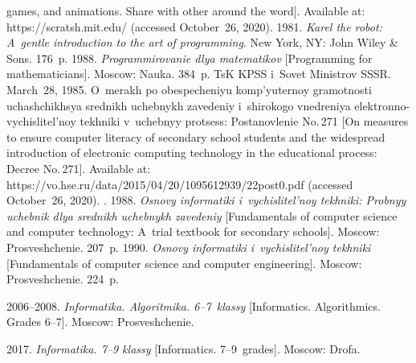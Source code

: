 \begin{multicols}{2}
{{\begin{thebibliography}{99}
games, and animations. Share with other around the word]. Available at: {\sf https://scratsh.mit.edu/} 
(accessed October~26, 2020).
 1981. \textit{Karel the robot: A~gentle introduction to the art of programming}. 
New York, NY: John Wiley \& Sons. 176~p. 
 1988. \textit{Programmirovanie dlya 
matematikov} [Programming for mathematicians]. Moscow: Nauka. 384~p.
TsK KPSS i~Sovet Ministrov SSSR. March~28, 1985. O~merakh po obespecheniyu komp'yuternoy 
gramotnosti uchashchikhsya srednikh uchebnykh zavedeniy i~shirokogo vnedreniya 
elektronno-vychislitel'noy tekh\-ni\-ki v~uchebnyy protsess: Postanovlenie No.\,271 [On measures to 
ensure computer 
literacy of secondary school students and the widespread introduction of electronic computing technology 
in the educational process: Decree No.\,271]. Available at:  {\sf 
https://vo.hse.ru/\linebreak data/2015/04/20/1095612939/22post0.pdf} (accessed October~26, 2020).
. 
1988. \textit{Osnovy informatiki i~vychislitel'noy tekhniki: Probnyy uchebnik dlya srednikh uchebnykh 
zavedeniy} [Fundamentals of computer science and computer technology: A~trial textbook for secondary 
schools]. Moscow: Prosveshchenie. 207~p. 
 1990. \textit{Osnovy informatiki 
i~vychislitel'noy tekhniki} [Fundamentals of computer science and computer engineering]. Moscow: Prosveshchenie. 224~p. 


 2006--2008. 
\textit{Informatika. Algoritmika. 6--7~klassy} [Informatics. Algorithmics. Grades 6--7]. Moscow: 
Prosveshchenie. 

 2017. 
\textit{Informatika. 7--9 klassy} [Informatics.  
7--9~grades]. Moscow: Drofa. 


\end{thebibliography}}}
\end{multicols}
